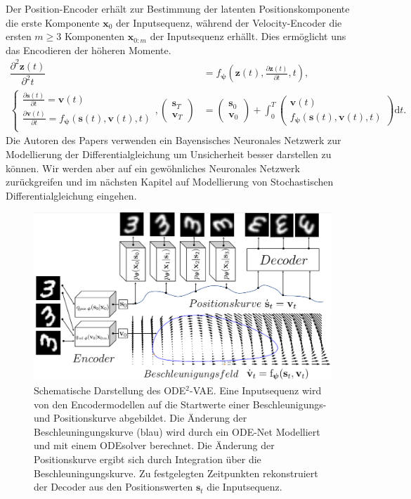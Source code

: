 \documentclass[12pt]{article}
\begin{document}
	Der Position-Encoder erhält zur Bestimmung der latenten Positionskomponente die erste Komponente $\mathbf x_{0}$ der Inputsequenz, während der Velocity-Encoder die ersten $m\geq 3$ Komponenten $\mathbf x_{0:m}$ der Inputsequenz erhällt. Dies ermöglicht uns das Encodieren der höheren Momente.
	\begin{align*}
	\dfrac{\partial^2 \mathbf{z}(t)}{\partial^2 t}&=f_{\boldsymbol{\psi}}\left(\mathbf{z}(t), \tfrac{\partial \mathbf{z}(t)}{\partial t}, t\right), \\
	\begin{cases*}
	\tfrac{\partial \mathbf{s}(t)}{\partial t}=\mathbf v(t) \\
	\tfrac{\partial \mathbf{v}(t)}{\partial t}=f_{\boldsymbol{\psi}}(\mathbf s(t), \mathbf v(t), t) \\
	\end{cases*},
	\left(\begin{array}{cc}
	\mathbf s_{T} \\
	\mathbf v_{T}
	\end{array}\right)
	&=
	\left(\begin{array}{cc}
	\mathbf s_{0} \\
	\mathbf v_{0}
	\end{array}\right)
	+
	\int_{0}^{T}
	\left(\begin{array}{cc}
	\mathbf v(t) \\
	f_{\boldsymbol{\psi}}(\mathbf s(t), \mathbf v(t), t)
	\end{array}\right)
	\mathrm{d}t.
	\end{align*}
	Die Autoren des Papers verwenden ein Bayensisches Neuronales Netzwerk zur Modellierung der Differentialgleichung um Unsicherheit besser darstellen zu können. Wir werden aber auf ein gewöhnliches Neuronales Netzwerk zurückgreifen und im nächsten Kapitel auf Modellierung von Stochastischen Differentialgleichung eingehen.
	\begin{figure}[h!]
		\centering
		\includegraphics[scale=0.57]{ODE2VAE_ODE_Net}
		\captionsetup{labelformat=empty}
		\caption{Schematische Darstellung des ODE$^2$-VAE. Eine Inputsequenz wird von den Encodermodellen auf die Startwerte einer Beschleunigungs- und Positionskurve abgebildet. Die Änderung der Beschleuningungskurve (blau) wird durch ein ODE-Net Modelliert und mit einem ODEsolver berechnet. Die Änderung der Positionskurve ergibt sich durch Integration über die Beschleuningungskurve. Zu festgelegten Zeitpunkten rekonstruiert der Decoder aus den Positionswerten $\mathbf{s}_t$ die Inputsequenz.}
	\end{figure}
\end{document}
